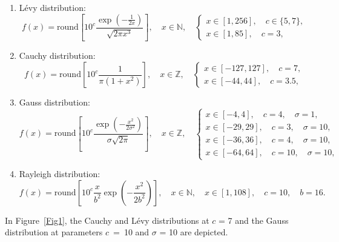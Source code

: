 \documentclass[entropy,article,accept,moreauthors,pdftex,10pt,a4paper]{mdpi}
\begin{document}
\begin{enumerate}[leftmargin=*,labelsep=4.9mm]
\item   L\'{e}vy distribution:
\begin{equation}
f(x) = \mbox{round}\left[10^c\frac{\exp\left({-\frac{1}{2x}}\right)}{\sqrt{2\pi x^3}}\right], \quad x \in \mathbb{N}, \quad
\begin{cases}
x \in [1, 256],\quad c \in \{5,7\},\\
x \in [1,85],\quad c = 3,
\end{cases}
\end{equation}

\item   Cauchy distribution:
\begin{equation}
f(x) = \mbox{round}\left[10^c\frac{1}{\pi \left(1+x^2\right)}\right], \quad x \in \mathbb{Z}, \quad \begin{cases}
x \in [-127, 127],\quad c = 7,\\
x \in [-44, 44],\quad c = 3.5,
\end{cases}
\end{equation}

\item   Gauss distribution:
\begin{equation}
f(x) = \mbox{round}\left[10^c\frac{\exp\left({-\frac{x^2}{2\sigma^2}}\right)}{\sigma \sqrt{2\pi}}\right], \quad x \in \mathbb{Z}, \quad
\begin{cases}
x \in [-4, 4],\quad c = 4,\quad \sigma = 1, \\
x \in [-29, 29],\quad c = 3,\quad \sigma = 10, \\
x \in [-36, 36],\quad c = 4,\quad \sigma = 10, \\
x \in [-64, 64],\quad c = 10,\quad \sigma = 10,
\end{cases}
\end{equation}

\item Rayleigh distribution:
\begin{equation}
f(x) = \mbox{round}\left[10^c\frac{x}{b^2}\exp\left(-\frac{x^2}{2b^2}\right)\right], \quad x \in \mathbb{N}, \quad x \in [1, 108], \quad c = 10, \quad b = 16.
\end{equation}
\end{enumerate}

In Figure~\ref{Fig1}, the Cauchy and L\'{e}vy distributions at $c$ = 7 and the Gauss distribution at parameters $c$~=~10 and $\sigma$ = 10 are depicted.
\end{document}
